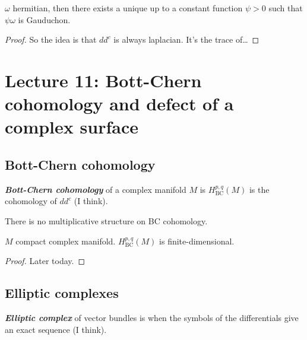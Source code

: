 \begin{thm}[Gauduchon]\leavevmode
\(\omega\) hermitian, then there exists a unique up to a constant function \(\psi>0\) such that \(\psi\omega\) is Gauduchon.
\end{thm}

\begin{proof}\leavevmode
So the idea is that \(d d^c\) is always laplacian. It's the trace of…
\end{proof}

\section{Lecture 11: Bott-Chern cohomology and defect of a complex surface}

\subsection{Bott-Chern cohomology}

\begin{defn}\leavevmode
\textit{\textbf{Bott-Chern cohomology}} of a complex manifold \(M\) is \(H^{p,q}_{\operatorname{BC}}(M)\) is the cohomology of \(d d^c\) (I think).
\end{defn}

\begin{remark}\leavevmode
There is no multiplicative structure on BC cohomology.
\end{remark}

\begin{thm}\leavevmode
\(M\) compact complex manifold. \(H^{p,q}_{\operatorname{BC}}(M)\) is finite-dimensional.
\end{thm}

\begin{proof}\leavevmode
Later today.
\end{proof}

\subsection{Elliptic complexes}

\begin{defn}\leavevmode
\textit{\textbf{Elliptic complex}} of vector bundles is when the symbols of the differentials give an exact sequence (I think).
\end{defn}

\begin{defn}\leavevmode

\end{defn}

